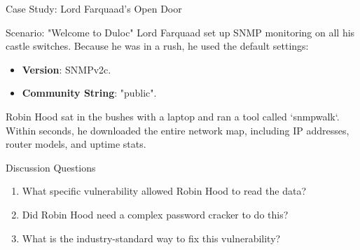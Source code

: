 \documentclass[aspectratio=169]{beamer}  %
\begin{document}
\begin{frame}{Case Study: Lord Farquaad's Open Door}
    \begin{alertblock}{Scenario: "Welcome to Duloc"}
        \footnotesize
        Lord Farquaad set up SNMP monitoring on all his castle switches. Because he was in a rush, he used the default settings:
        \begin{itemize}
            \item \textbf{Version}: SNMPv2c.
            \item \textbf{Community String}: "public".
        \end{itemize}
        
        Robin Hood sat in the bushes with a laptop and ran a tool called `snmpwalk`. Within seconds, he downloaded the entire network map, including IP addresses, router models, and uptime stats.
    \end{alertblock}
    \begin{block}{Discussion Questions}
        \footnotesize
        \begin{enumerate}
            \item What specific vulnerability allowed Robin Hood to read the data?
            \item Did Robin Hood need a complex password cracker to do this?
            \item What is the industry-standard way to fix this vulnerability?
        \end{enumerate}
    \end{block}
\end{frame}
\end{document}
